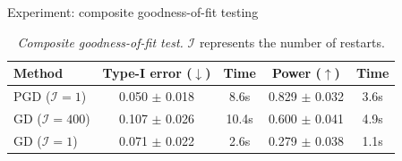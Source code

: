 \documentclass[aspectratio=169,xcolor=dvipsnames]{beamer}
\let\oldcitep\citep
\renewcommand{\citep}[1]{{\scriptsize\textcolor{graytext}{\oldcitep{#1}}}}
\begin{document}
\begin{frame}{Experiment: composite goodness-of-fit testing~\citep{key2025composite}}
    \begin{table}
        \centering
        \renewcommand{\arraystretch}{1.15}
        \begin{tabular}{lcc|cc}
            \toprule
            Method & Type-I error ($\downarrow$) & Time & Power ($\uparrow$) & Time \\
            \midrule
            PGD ($\mathcal{I}=1$) & 0.050 $\pm$ 0.018 & 8.6s & 0.829 $\pm$ 0.032 & 3.6s \\
            \midrule
            GD ($\mathcal{I}=400$) & 0.107 $\pm$ 0.026 & 10.4s & 0.600 $\pm$ 0.041 & 4.9s \\
            GD ($\mathcal{I}=1$) & 0.071 $\pm$ 0.022 & 2.6s & 0.279 $\pm$ 0.038 & 1.1s \\
            \bottomrule
        \end{tabular}
        \caption{\textit{Composite goodness-of-fit test.} $\mathcal{I}$ represents the number of restarts. }
    \end{table}
    \vspace{-0.15cm}
\end{frame}
\end{document}

